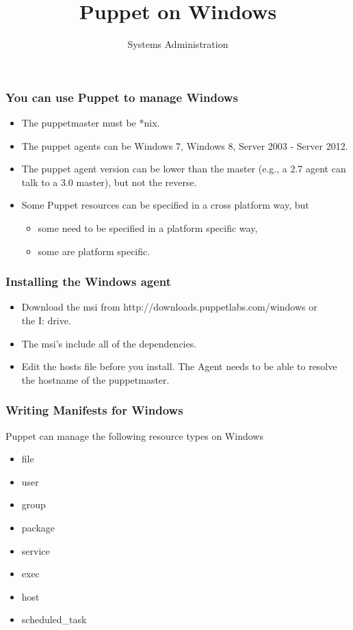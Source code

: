 \documentclass[10pt]{beamer}
\title{Puppet on Windows}
\author[IN719]{Systems Administration}
\institute[Otago Polytechnic]{
  Otago Polytechnic \\
  Dunedin, New Zealand \\
}
\date{}
\begin{document}
\begin{frame}[plain]
  \titlepage
\end{frame}

\begin{frame}
  \frametitle{You can use Puppet to manage Windows}
  
\begin{itemize}
\item The puppetmaster must be *nix.
\item  The puppet agents can be Windows 7, Windows 8,  Server 2003 - Server 2012.
\item  The puppet agent version can be lower than the master (e.g., a 2.7 agent can talk to a 3.0 master), but not the reverse.
\item Some Puppet resources can be specified in a cross platform way, but
         \begin{itemize}
\item  some need to be specified in a platform specific way,
\item  some are platform specific.
\end{itemize}
\end{itemize}
\end{frame}

\begin{frame}
  \frametitle{Installing the Windows agent}
  
\begin{itemize}
\item Download the msi from http://downloads.puppetlabs.com/windows or \\ the I: drive.
\item The msi's include all of the dependencies.
\item Edit the hosts file before you install.  The Agent needs to be able to resolve the hostname of the puppetmaster.
\end{itemize}


\end{frame}

\begin{frame}
 \frametitle{Writing Manifests for Windows}
  
Puppet can manage the following resource types on Windows
\begin{itemize}
\item file
\item user
\item group
\item package
\item service
\item exec
\item host
\item scheduled\_task
\end{itemize}


\end{frame}
\end{document}
